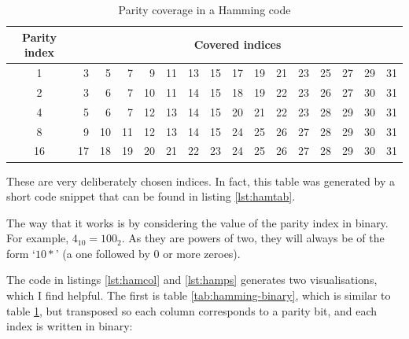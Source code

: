 \documentclass[11pt]{article}
\begin{document}
\begin{table}[H]
\begin{center}
    \begin{tabular}{crrrrrrrrrrrrrrr}
    \toprule
    Parity index & \multicolumn{15}{c}{Covered indices} \\
    \midrule
    1 & 3 & 5 & 7 & 9 & 11 & 13 & 15 & 17 & 19 & 21 & 23 & 25 & 27 & 29 & 31 \\
    2 & 3 & 6 & 7 & 10 & 11 & 14 & 15 & 18 & 19 & 22 & 23 & 26 & 27 & 30 & 31 \\
    4 & 5 & 6 & 7 & 12 & 13 & 14 & 15 & 20 & 21 & 22 & 23 & 28 & 29 & 30 & 31 \\
    8 & 9 & 10 & 11 & 12 & 13 & 14 & 15 & 24 & 25 & 26 & 27 & 28 & 29 & 30 & 31 \\
    16 & 17 & 18 & 19 & 20 & 21 & 22 & 23 & 24 & 25 & 26 & 27 & 28 & 29 & 30 & 31 \\
    \bottomrule
    \end{tabular}
    \caption{Parity coverage in a Hamming code}\label{tab:hamming-indices}
\end{center}
\end{table}

    These are very deliberately chosen indices. In fact, this table was
    generated by a short code snippet that can be found in listing
    \ref{lst:hamtab}.

    The way that it works is by considering the value of the parity index in
    binary. For example, $4_{10}=100_{2}$. As they are powers of two, they will
    always be of the form `$10*$' (a one followed by 0 or more zeroes).

    The code in listings \ref{lst:hamcol} and \ref{lst:hamps} generates two
    visualisations, which I find helpful. The first is table
    \ref{tab:hamming-binary}, which is similar to table
    \ref{tab:hamming-indices}, but transposed so each column corresponds to a
    parity bit, and each index is written in binary:
\end{document}

